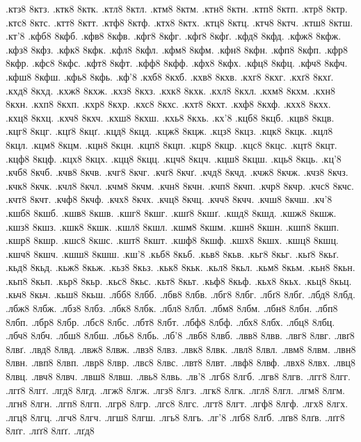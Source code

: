{.ктз8
8ктз.
.ктк8
8ктк.
.ктл8
8ктл.
.ктм8
8ктм.
.ктн8
8ктн.
.ктп8
8ктп.
.ктр8
8ктр.
.ктс8
8ктс.
.ктт8
8ктт.
.ктф8
8ктф.
.ктх8
8ктх.
.ктц8
8ктц.
.ктч8
8ктч.
.ктш8
8ктш.
.кт'8
.кфб8
8кфб.
.кфв8
8кфв.
.кфг8
8кфг.
.кфґ8
8кфґ.
.кфд8
8кфд.
.кфж8
8кфж.
.кфз8
8кфз.
.кфк8
8кфк.
.кфл8
8кфл.
.кфм8
8кфм.
.кфн8
8кфн.
.кфп8
8кфп.
.кфр8
8кфр.
.кфс8
8кфс.
.кфт8
8кфт.
.кфф8
8кфф.
.кфх8
8кфх.
.кфц8
8кфц.
.кфч8
8кфч.
.кфш8
8кфш.
.кфь8
8кфь.
.кф'8
.кхб8
8кхб.
.кхв8
8кхв.
.кхг8
8кхг.
.кхґ8
8кхґ.
.кхд8
8кхд.
.кхж8
8кхж.
.кхз8
8кхз.
.кхк8
8кхк.
.кхл8
8кхл.
.кхм8
8кхм.
.кхн8
8кхн.
.кхп8
8кхп.
.кхр8
8кхр.
.кхс8
8кхс.
.кхт8
8кхт.
.кхф8
8кхф.
.кхх8
8кхх.
.кхц8
8кхц.
.кхч8
8кхч.
.кхш8
8кхш.
.кхь8
8кхь.
.кх'8
.кцб8
8кцб.
.кцв8
8кцв.
.кцг8
8кцг.
.кцґ8
8кцґ.
.кцд8
8кцд.
.кцж8
8кцж.
.кцз8
8кцз.
.кцк8
8кцк.
.кцл8
8кцл.
.кцм8
8кцм.
.кцн8
8кцн.
.кцп8
8кцп.
.кцр8
8кцр.
.кцс8
8кцс.
.кцт8
8кцт.
.кцф8
8кцф.
.кцх8
8кцх.
.кцц8
8кцц.
.кцч8
8кцч.
.кцш8
8кцш.
.кць8
8кць.
.кц'8
.кчб8
8кчб.
.кчв8
8кчв.
.кчг8
8кчг.
.кчґ8
8кчґ.
.кчд8
8кчд.
.кчж8
8кчж.
.кчз8
8кчз.
.кчк8
8кчк.
.кчл8
8кчл.
.кчм8
8кчм.
.кчн8
8кчн.
.кчп8
8кчп.
.кчр8
8кчр.
.кчс8
8кчс.
.кчт8
8кчт.
.кчф8
8кчф.
.кчх8
8кчх.
.кчц8
8кчц.
.кчч8
8кчч.
.кчш8
8кчш.
.кч'8
.кшб8
8кшб.
.кшв8
8кшв.
.кшг8
8кшг.
.кшґ8
8кшґ.
.кшд8
8кшд.
.кшж8
8кшж.
.кшз8
8кшз.
.кшк8
8кшк.
.кшл8
8кшл.
.кшм8
8кшм.
.кшн8
8кшн.
.кшп8
8кшп.
.кшр8
8кшр.
.кшс8
8кшс.
.кшт8
8кшт.
.кшф8
8кшф.
.кшх8
8кшх.
.кшц8
8кшц.
.кшч8
8кшч.
.кшш8
8кшш.
.кш'8
.кьб8
8кьб.
.кьв8
8кьв.
.кьг8
8кьг.
.кьґ8
8кьґ.
.кьд8
8кьд.
.кьж8
8кьж.
.кьз8
8кьз.
.кьк8
8кьк.
.кьл8
8кьл.
.кьм8
8кьм.
.кьн8
8кьн.
.кьп8
8кьп.
.кьр8
8кьр.
.кьс8
8кьс.
.кьт8
8кьт.
.кьф8
8кьф.
.кьх8
8кьх.
.кьц8
8кьц.
.кьч8
8кьч.
.кьш8
8кьш.
.лбб8
8лбб.
.лбв8
8лбв.
.лбг8
8лбг.
.лбґ8
8лбґ.
.лбд8
8лбд.
.лбж8
8лбж.
.лбз8
8лбз.
.лбк8
8лбк.
.лбл8
8лбл.
.лбм8
8лбм.
.лбн8
8лбн.
.лбп8
8лбп.
.лбр8
8лбр.
.лбс8
8лбс.
.лбт8
8лбт.
.лбф8
8лбф.
.лбх8
8лбх.
.лбц8
8лбц.
.лбч8
8лбч.
.лбш8
8лбш.
.лбь8
8лбь.
.лб'8
.лвб8
8лвб.
.лвв8
8лвв.
.лвг8
8лвг.
.лвґ8
8лвґ.
.лвд8
8лвд.
.лвж8
8лвж.
.лвз8
8лвз.
.лвк8
8лвк.
.лвл8
8лвл.
.лвм8
8лвм.
.лвн8
8лвн.
.лвп8
8лвп.
.лвр8
8лвр.
.лвс8
8лвс.
.лвт8
8лвт.
.лвф8
8лвф.
.лвх8
8лвх.
.лвц8
8лвц.
.лвч8
8лвч.
.лвш8
8лвш.
.лвь8
8лвь.
.лв'8
.лгб8
8лгб.
.лгв8
8лгв.
.лгг8
8лгг.
.лгґ8
8лгґ.
.лгд8
8лгд.
.лгж8
8лгж.
.лгз8
8лгз.
.лгк8
8лгк.
.лгл8
8лгл.
.лгм8
8лгм.
.лгн8
8лгн.
.лгп8
8лгп.
.лгр8
8лгр.
.лгс8
8лгс.
.лгт8
8лгт.
.лгф8
8лгф.
.лгх8
8лгх.
.лгц8
8лгц.
.лгч8
8лгч.
.лгш8
8лгш.
.лгь8
8лгь.
.лг'8
.лґб8
8лґб.
.лґв8
8лґв.
.лґг8
8лґг.
.лґґ8
8лґґ.
.лґд8
}
